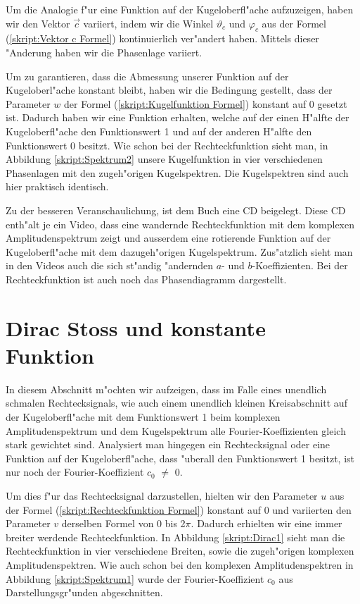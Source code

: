 \begin{refsection}
Um die Analogie f"ur eine Funktion auf der Kugeloberfl"ache aufzuzeigen, 
haben wir den Vektor $\vec{c}$ variiert, indem wir die Winkel $\vartheta_c$
und $\varphi_c$ aus der Formel (\ref{skript:Vektor c Formel}) 
kontinuierlich ver"andert haben. 
Mittels dieser "Anderung haben wir die Phasenlage variiert.
 
Um zu garantieren, dass die Abmessung unserer Funktion auf der 
Kugeloberl"ache konstant bleibt, haben wir die Bedingung gestellt,
dass der Parameter $w$ der Formel (\ref{skript:Kugelfunktion Formel}) 
konstant auf 0 gesetzt ist. 
Dadurch haben wir eine Funktion erhalten, welche auf der einen 
H"alfte der Kugeloberfl"ache den Funktionswert 1 und auf der 
anderen H"alfte den Funktionswert 0 besitzt. 
Wie schon bei der Rechteckfunktion sieht man, in Abbildung 
\ref{skript:Spektrum2}  
unsere Kugelfunktion in vier verschiedenen Phasenlagen mit den 
zugeh"origen Kugelspektren.
Die Kugelspektren sind auch hier praktisch identisch. 

Zu der besseren Veranschaulichung, ist dem Buch eine CD 
beigelegt.
Diese CD enth"alt je ein Video, dass eine wandernde 
Rechteckfunktion mit dem komplexen Amplitudenspektrum zeigt und
ausserdem eine rotierende Funktion auf der Kugeloberfl"ache mit 
dem  dazugeh"origen Kugelspektrum. 
Zus"atzlich sieht man in den Videos auch
die sich st"andig "andernden $a$- und $b$-Koeffizienten. Bei der 
Rechteckfunktion ist auch noch das Phasendiagramm dargestellt.


\section{Dirac Stoss und konstante Funktion}
In diesem Abschnitt m"ochten wir aufzeigen, dass im Falle eines 
unendlich schmalen Rechtecksignals, wie auch einem unendlich kleinen 
Kreisabschnitt auf der Kugeloberfl"ache mit dem Funktionswert 1 beim 
komplexen Amplitudenspektrum und dem Kugelspektrum alle 
Fourier-Koeffizienten gleich stark gewichtet sind. 
Analysiert man hingegen ein Rechtecksignal oder eine Funktion auf der 
Kugeloberfl"ache, dass "uberall den Funktionswert 1 besitzt, ist nur 
noch der Fourier-Koeffizient $c_0$ $\neq$ 0.

Um dies f"ur das Rechtecksignal darzustellen, hielten wir den Parameter
$u$ aus der Formel (\ref{skript:Rechteckfunktion Formel}) konstant auf 0 
und variierten den Parameter $v$ derselben Formel von 0 bis 2$\pi$. 
Dadurch erhielten wir eine immer breiter werdende Rechteckfunktion. 
In Abbildung \ref{skript:Dirac1} sieht man die Rechteckfunktion in 
vier verschiedene Breiten, sowie die zugeh"origen komplexen 
Amplitudenspektren. 
Wie auch schon bei den komplexen Amplitudenspektren in Abbildung
\ref{skript:Spektrum1} wurde der Fourier-Koeffizient $c_0$ aus 
Darstellungsgr"unden abgeschnitten.


\end{refsection}
